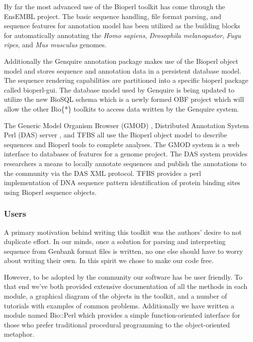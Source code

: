 \documentclass[12pt]{article}
\begin{document}
By far the most advanced use of the Bioperl toolkit has come through
the EnsEMBL project.  The basic sequence handling, file format
parsing, and sequence features for annotation model has been utilized
as the building blocks for automatically annotating the \textit{Homo sapiens},
\textit{Drosophila melanogastor}, \textit{Fugu ripes}, and 
\textit{Mus musculus} genomes.

Additionally the Genquire\cite{genquire} annotation package makes use
of the Bioperl object model and stores sequence and annotation data in a
persistent database model.  The sequence rendering capabilities are
partitioned into a specific bioperl package called bioperl-gui.  The
database model used by Genquire is being updated to utilize the new
BioSQL schema which is a newly formed OBF project which will allow
the other Bio\{*\} toolkits to access data written by the Genquire system. 

The Generic Model Organism Browser (GMOD) \cite{gmod}, Distributed
Annotation System Perl (DAS) server \cite{das,biodbgff}, and TFBS
\cite{tfbs} all use the Bioperl object model to describe sequences and
Bioperl tools to complete analyses.  The GMOD system is a web
interface to databases of features for a genome project.  The DAS
system provides researchers a means to locally annotate sequences and
publish the annotations to the community via the DAS XML protocol.
TFBS provides a perl implementation of DNA sequence pattern
identification of protein binding sites using Bioperl sequence objects.

\subsubsection{Users}

A primary motivation behind writing this toolkit was the authors'
desire to not duplicate effort.  In our minds, once a solution for
parsing and interpreting sequence from Genbank format files is
written, no one else should have to worry about writing their own.  In
this spirit we chose to make our code free.

However, to be adopted by the community our software has be user
friendly.  To that end we've both provided extensive documentation of
all the methods in each module, a graphical diagram of the objects in
the toolkit, and a number of tutorials with examples of common
problems.  Additionally we have written a module named Bio::Perl which
provides a simple function-oriented interface for those who prefer
traditional procedural programming to the object-oriented metaphor.
\end{document}
